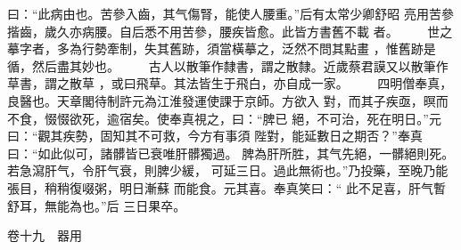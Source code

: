 \documentclass{ctexart}
\begin{document}
曰：``此病由也。苦參入齒，其气傷腎，能使人腰重。''后有太常少卿舒昭 亮用苦參揩齒，歲久亦病腰。自后悉不用苦參，腰疾皆愈。此皆方書舊不載 者。 　　世之摹字者，多為行勢牽制，失其舊跡，須當橫摹之，泛然不問其點畫 ，惟舊跡是循，然后盡其妙也。 　　古人以散筆作隸書，謂之散隸。近歲蔡君謨又以散筆作草書，謂之散草 ，或曰飛草。其法皆生于飛白，亦自成一家。 　　四明僧奉真，良醫也。天章閣待制許元為江淮發運使課于京師。方欲入 對，而其子疾亟，暝而不食，惙惙欲死，逾宿矣。使奉真視之，曰：``脾已 絕，不可治，死在明日。''元曰：``觀其疾勢，固知其不可救，今方有事須 陛對，能延數日之期否？''奉真曰：``如此似可，諸髒皆已衰唯肝髒獨過。 脾為肝所胜，其气先絕，一髒絕則死。若急瀉肝气，令肝气衰，則脾少緩， 可延三日。過此無術也。''乃投藥，至晚乃能張目，稍稍復啜粥，明日漸蘇 而能食。元其喜。奉真笑曰：`` 此不足喜，肝气暫舒耳，無能為也。''后 三日果卒。

卷十九　器用
\end{document}

